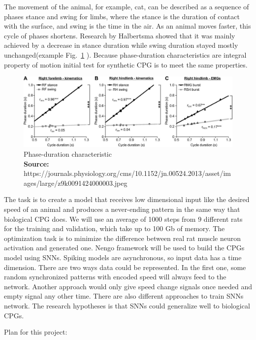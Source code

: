 \documentclass[runningheads]{llncs}
\newcommand*{\captionsource}[2]{%
  \caption[{#1}]{%
    #1%
    \\\hspace{\linewidth}%
    \textbf{Source:} #2%
  }%
}
\begin{document}
The movement of the animal, for example, cat, can be described as a sequence of phases stance and swing for limbs, where the stance is the duration of contact with the surface, and swing is the time in the air. As an animal moves faster, this cycle of phases shortens. Research by Halbertsma \cite{ref24_1} showed that it was mainly achieved by a decrease in stance duration while swing duration stayed mostly unchanged(example Fig.~\ref{fig3} ). Because phase-duration characteristics are integral property of motion initial test for synthetic CPG is to meet the same properties.

\begin{figure}
\includegraphics[width=\textwidth]{images/images_large_z9k0091424000003.jpeg}

\captionsource{Phase-duration characteristic}{ https://journals.physiology.org/cms/10.1152/jn.00524.2013/asset/images/large/z9k0091424000003.jpeg} \label{fig3}

\end{figure}


The task is to create a model that receives low dimensional input like the desired speed of an animal and produces a never-ending pattern in the same way that biological CPG does. We will use an average of 1000 steps from 9 different rats for the training and validation, which take up to 100 Gb of memory. The optimization task is to minimize the difference between real rat muscle neuron activation and generated one. Nengo framework will be used to build the CPGs model using SNNs. Spiking models are asynchronous, so input data has a time dimension. There are two ways data could be represented. In the first one, some random synchronized patterns with encoded speed will always feed to the network. Another approach would only give speed change signals once needed and empty signal any other time. There are also different approaches to train SNNs network. The research hypotheses is that SNNs could generalize well to biological CPGs.

Plan for this project:
\end{document}
